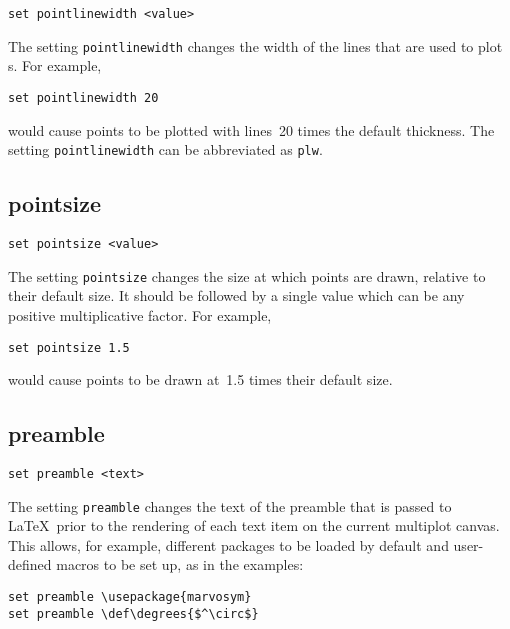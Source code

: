 \begin{verbatim}
set pointlinewidth <value>
\end{verbatim}

The setting {\tt pointlinewidth} changes the width of the lines that are used
to plot \datapoint s.  For example,

\begin{verbatim}
set pointlinewidth 20
\end{verbatim}

\noindent would cause points to be plotted with lines~20 times the default
thickness.  The setting {\tt pointlinewidth} can be abbreviated as {\tt plw}.


\subsection{pointsize}

\begin{verbatim}
set pointsize <value>
\end{verbatim}

The setting {\tt pointsize} changes the size at which points are drawn,
relative to their default size. It should be followed by a single value which
can be any positive multiplicative factor. For example,

\begin{verbatim}
set pointsize 1.5
\end{verbatim}

\noindent would cause points to be drawn at~1.5 times their default size.


\subsection{preamble}

\begin{verbatim}
set preamble <text>
\end{verbatim}

The setting {\tt preamble} changes the text of the preamble that is passed to
\LaTeX\ prior to the rendering of each text item on the current multiplot
canvas.  This allows, for example, different packages to be loaded by default
and user-defined macros to be set up, as in the examples:

\begin{verbatim}
set preamble \usepackage{marvosym}
set preamble \def\degrees{$^\circ$}
\end{verbatim}


